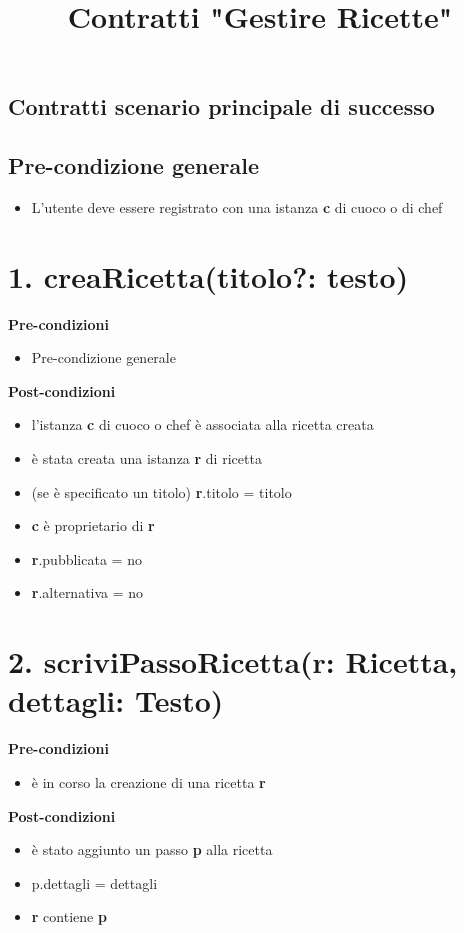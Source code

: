\documentclass[12pt]{extarticle}
\begin{document}
\title{Contratti "Gestire Ricette"}
\date{}
\maketitle

\begin{center}
  \section*{Contratti scenario principale di successo}
\end{center}

\subsection*{Pre-condizione generale}
\begin{itemize}
  \item L'utente deve essere registrato con una istanza \textbf{c} di cuoco o di chef
\end{itemize}

\section*{1. creaRicetta(titolo?: testo)}
\textbf{Pre-condizioni}
\begin{itemize}
  \item Pre-condizione generale
\end{itemize}
\textbf{Post-condizioni}
\begin{itemize}
  \item l'istanza \textbf{c} di cuoco o chef è associata alla ricetta creata
  \item è stata creata una istanza \textbf{r} di ricetta
  \item (se è specificato un titolo) \textbf{r}.titolo = titolo
  \item \textbf{c} è proprietario di \textbf{r}
  \item \textbf{r}.pubblicata = no
  \item \textbf{r}.alternativa = no
\end{itemize}

\section*{2. scriviPassoRicetta(r: Ricetta, dettagli: Testo)}

\textbf{Pre-condizioni} 	
\begin{itemize}
  \item è in corso la creazione di una ricetta  \textbf{r}
\end{itemize}
\textbf{Post-condizioni}
\begin{itemize}
  \item è stato aggiunto un passo  \textbf{p} alla ricetta
  \item p.dettagli = dettagli
  \item  \textbf{r} contiene  \textbf{p}
\end{itemize}
\end{document}
